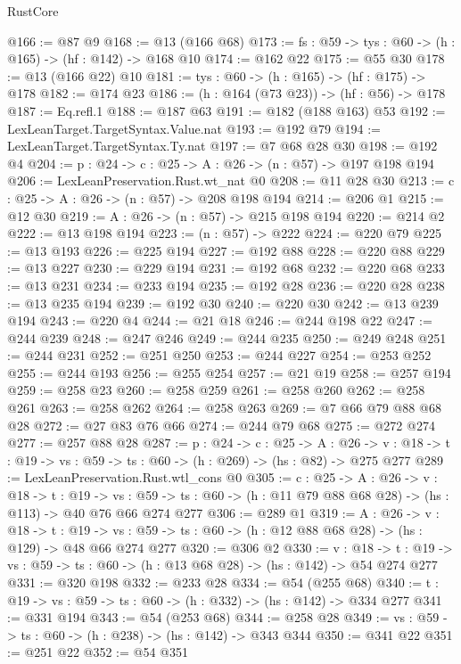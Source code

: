 \begin{lexlean}{RustCore}
\begin{coremodule}
@166 := @87 @9
@168 := @13 (@166 @68)
@173 := {fs : @59} -> {tys : @60} -> (h : @165) -> (hf : @142) -> @168 @10
@174 := @162 @22
@175 := @55 @30
@178 := @13 (@166 @22) @10
@181 := {tys : @60} -> (h : @165) -> (hf : @175) -> @178
@182 := @174 @23
@186 := (h : @164 (@73 @23)) -> (hf : @56) -> @178
@187 := Eq.refl.{1}
@188 := @187 @63
@191 := @182 (@188 @163) @53
@192 := LexLeanTarget.TargetSyntax.Value.nat
@193 := @192 @79
@194 := LexLeanTarget.TargetSyntax.Ty.nat
@197 := @7 @68 @28 @30
@198 := @192 @4
@204 := {p : @24} -> {c : @25} -> {A : @26} -> (n : @57) -> @197 @198 @194
@206 := LexLeanPreservation.Rust.wt_nat @0
@208 := @11 @28 @30
@213 := {c : @25} -> {A : @26} -> (n : @57) -> @208 @198 @194
@214 := @206 @1
@215 := @12 @30
@219 := {A : @26} -> (n : @57) -> @215 @198 @194
@220 := @214 @2
@222 := @13 @198 @194
@223 := (n : @57) -> @222
@224 := @220 @79
@225 := @13 @193
@226 := @225 @194
@227 := @192 @88
@228 := @220 @88
@229 := @13 @227
@230 := @229 @194
@231 := @192 @68
@232 := @220 @68
@233 := @13 @231
@234 := @233 @194
@235 := @192 @28
@236 := @220 @28
@238 := @13 @235 @194
@239 := @192 @30
@240 := @220 @30
@242 := @13 @239 @194
@243 := @220 @4
@244 := @21 @18
@246 := @244 @198 @22
@247 := @244 @239
@248 := @247 @246
@249 := @244 @235
@250 := @249 @248
@251 := @244 @231
@252 := @251 @250
@253 := @244 @227
@254 := @253 @252
@255 := @244 @193
@256 := @255 @254
@257 := @21 @19
@258 := @257 @194
@259 := @258 @23
@260 := @258 @259
@261 := @258 @260
@262 := @258 @261
@263 := @258 @262
@264 := @258 @263
@269 := @7 @66 @79 @88 @68 @28
@272 := @27 @83 @76 @66
@274 := @244 @79 @68
@275 := @272 @274
@277 := @257 @88 @28
@287 := {p : @24} ->
  {c : @25} ->
  {A : @26} ->
  {v : @18} -> {t : @19} -> {vs : @59} -> {ts : @60} -> (h : @269) -> (hs : @82) -> @275 @277
@289 := LexLeanPreservation.Rust.wtl_cons @0
@305 := {c : @25} ->
  {A : @26} ->
  {v : @18} ->
  {t : @19} ->
  {vs : @59} -> {ts : @60} -> (h : @11 @79 @88 @68 @28) -> (hs : @113) -> @40 @76 @66 @274 @277
@306 := @289 @1
@319 := {A : @26} ->
  {v : @18} ->
  {t : @19} -> {vs : @59} -> {ts : @60} -> (h : @12 @88 @68 @28) -> (hs : @129) -> @48 @66 @274 @277
@320 := @306 @2
@330 := {v : @18} ->
  {t : @19} -> {vs : @59} -> {ts : @60} -> (h : @13 @68 @28) -> (hs : @142) -> @54 @274 @277
@331 := @320 @198
@332 := @233 @28
@334 := @54 (@255 @68)
@340 := {t : @19} -> {vs : @59} -> {ts : @60} -> (h : @332) -> (hs : @142) -> @334 @277
@341 := @331 @194
@343 := @54 (@253 @68)
@344 := @258 @28
@349 := {vs : @59} -> {ts : @60} -> (h : @238) -> (hs : @142) -> @343 @344
@350 := @341 @22
@351 := @251 @22
@352 := @54 @351

\end{coremodule}
\end{lexlean}
